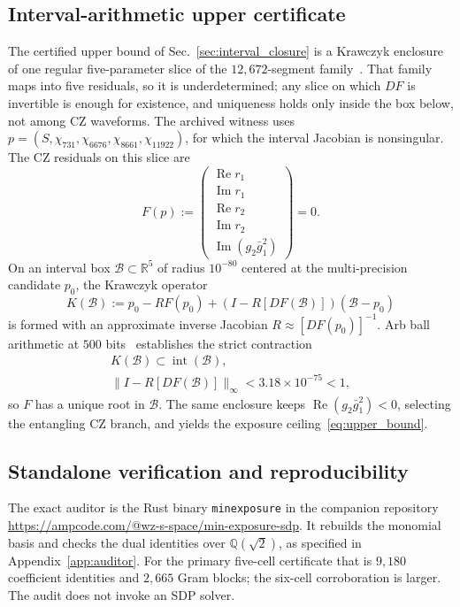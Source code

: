 \documentclass[aps,prx,reprint,nofootinbib,longbibliography,floatfix]{revtex4-2}
\theoremstyle{plain}
\theoremstyle{remark}
\begin{document}
\begin{sloppypar}
\subsection{Interval-arithmetic upper certificate}
\label{sec:interval_methods}
The certified upper bound of Sec.~\ref{sec:interval_closure} is a Krawczyk enclosure of one regular five-parameter slice of the $12{,}672$-segment family~\cite{Krawczyk69}. That family maps into five residuals, so it is underdetermined; any slice on which $DF$ is invertible is enough for existence, and uniqueness holds only inside the box below, not among CZ waveforms. The archived witness uses $p=(S,\chi_{731},\chi_{6676},\chi_{8661},\chi_{11922})$, for which the interval Jacobian is nonsingular. The CZ residuals on this slice are
\begin{equation}
F(p):=\begin{pmatrix}\operatorname{Re}r_1\\\operatorname{Im}r_1\\\operatorname{Re}r_2\\\operatorname{Im}r_2\\\operatorname{Im}(g_2\bar g_1^2)\end{pmatrix}=0.
\label{eq:F_map}
\end{equation}
On an interval box $\mathcal{B}\subset\mathbb{R}^5$ of radius $10^{-80}$ centered at the multi-precision candidate $p_0$, the Krawczyk operator
\begin{equation}
K(\mathcal{B}):=p_0-RF(p_0)+(I-R[DF(\mathcal{B})])(\mathcal{B}-p_0)
\end{equation}
is formed with an approximate inverse Jacobian $R\approx[DF(p_0)]^{-1}$. Arb ball arithmetic at $500$ bits~\cite{Johansson17} establishes the strict contraction
\begin{equation}
\begin{gathered}
K(\mathcal{B})\subset\operatorname{int}(\mathcal{B}),\\
\|I-R[DF(\mathcal{B})]\|_\infty<3.18\times10^{-75}<1,
\end{gathered}
\end{equation}
so $F$ has a unique root in $\mathcal{B}$. The same enclosure keeps $\operatorname{Re}(g_2\bar g_1^2)<0$, selecting the entangling CZ branch, and yields the exposure ceiling~\eqref{eq:upper_bound}.

\subsection{Standalone verification and reproducibility}
The exact auditor is the Rust binary \texttt{minexposure} in the companion repository \url{https://ampcode.com/@wz-s-space/min-exposure-sdp}. It rebuilds the monomial basis and checks the dual identities over $\mathbb Q(\sqrt2)$, as specified in Appendix~\ref{app:auditor}. For the primary five-cell certificate that is $9{,}180$ coefficient identities and $2{,}665$ Gram blocks; the six-cell corroboration is larger. The audit does not invoke an SDP solver.


\end{sloppypar}
\end{document}
